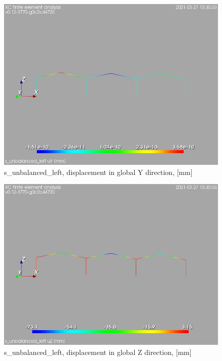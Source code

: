 \begin{figure}
\begin{center}
\includegraphics[width=\linewidth]{calc_results/sole_zeinali/text/graphics/resSimplLC/s_unbalanced_lefttotaluY}
\caption{s_unbalanced_left, displacement in global Y direction, [mm]}
\end{center}
\end{figure}
\begin{figure}
\begin{center}
\includegraphics[width=\linewidth]{calc_results/sole_zeinali/text/graphics/resSimplLC/s_unbalanced_lefttotaluZ}
\caption{s_unbalanced_left, displacement in global Z direction, [mm]}
\end{center}
\end{figure}
